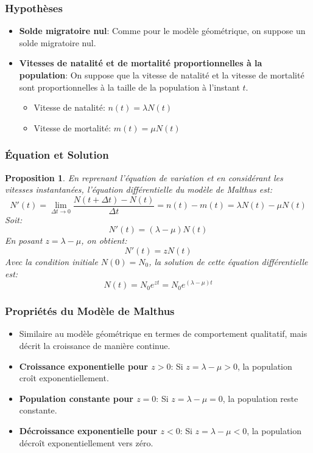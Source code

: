 \documentclass{article}
\newtheorem{proposition}{Proposition}
\begin{document}
\subsubsection{Hypothèses}

\begin{itemize}
    \item \textbf{Solde migratoire nul}: Comme pour le modèle géométrique, on suppose un solde migratoire nul.
    \item \textbf{Vitesses de natalité et de mortalité proportionnelles à la population}: On suppose que la vitesse de natalité et la vitesse de mortalité sont proportionnelles à la taille de la population à l'instant $t$.
    \begin{itemize}
        \item Vitesse de natalité: $n(t) = \lambda N(t)$
        \item Vitesse de mortalité: $m(t) = \mu N(t)$
    \end{itemize}
\end{itemize}

\subsubsection{Équation et Solution}
\begin{proposition}
En reprenant l'équation de variation et en considérant les vitesses instantanées, l'équation différentielle du modèle de Malthus est:
\[
N'(t) = \lim_{\Delta t \to 0} \frac{N(t + \Delta t) - N(t)}{\Delta t} = n(t) - m(t) = \lambda N(t) - \mu N(t)
\]
Soit:
\[
N'(t) = (\lambda - \mu) N(t)
\]
En posant $z = \lambda - \mu$, on obtient:
\[
N'(t) = z N(t)
\]
Avec la condition initiale $N(0) = N_0$, la solution de cette équation différentielle est:
\[
N(t) = N_0 e^{zt} = N_0 e^{(\lambda - \mu)t}
\]
\end{proposition}


\subsubsection{Propriétés du Modèle de Malthus}
\begin{itemize}
    \item Similaire au modèle géométrique en termes de comportement qualitatif, mais décrit la croissance de manière continue.
    \item \textbf{Croissance exponentielle pour $z > 0$}: Si $z = \lambda - \mu > 0$, la population croît exponentiellement.
    \item \textbf{Population constante pour $z = 0$}: Si $z = \lambda - \mu = 0$, la population reste constante.
    \item \textbf{Décroissance exponentielle pour $z < 0$}: Si $z = \lambda - \mu < 0$, la population décroît exponentiellement vers zéro.
\end{itemize}
\end{document}
